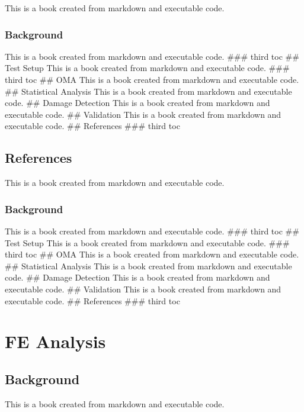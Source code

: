 \documentclass[
  letterpaper,
  DIV=11,
  numbers=noendperiod]{scrreprt}
\begin{document}
This is a book created from markdown and executable code.

\hypertarget{background-5}{%
\section{Background}\label{background-5}}

This is a book created from markdown and executable code. \#\#\# third
toc \#\# Test Setup This is a book created from markdown and executable
code. \#\#\# third toc \#\# OMA This is a book created from markdown and
executable code. \#\# Statistical Analysis This is a book created from
markdown and executable code. \#\# Damage Detection This is a book
created from markdown and executable code. \#\# Validation This is a
book created from markdown and executable code. \#\# References \#\#\#
third toc

\hypertarget{references}{%
\chapter{References}\label{references}}

This is a book created from markdown and executable code.

\hypertarget{background-6}{%
\section{Background}\label{background-6}}

This is a book created from markdown and executable code. \#\#\# third
toc \#\# Test Setup This is a book created from markdown and executable
code. \#\#\# third toc \#\# OMA This is a book created from markdown and
executable code. \#\# Statistical Analysis This is a book created from
markdown and executable code. \#\# Damage Detection This is a book
created from markdown and executable code. \#\# Validation This is a
book created from markdown and executable code. \#\# References \#\#\#
third toc

\part{FE Analysis}

\hypertarget{background-7}{%
\chapter{Background}\label{background-7}}

This is a book created from markdown and executable code.
\end{document}
